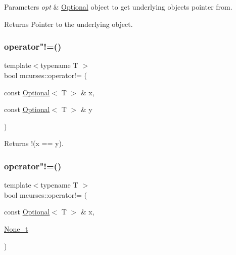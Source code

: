 \begin{DoxyParams}{Parameters}
{\em opt} & \hyperlink{classmcurses_1_1Optional}{Optional} object to get underlying object\textquotesingle{}s pointer from. \\
\hline
\end{DoxyParams}
\begin{DoxyReturn}{Returns}
Pointer to the underlying object. 
\end{DoxyReturn}
\hypertarget{namespacemcurses_a6d95bd0d73b2c0d5127cd67b744f47e3}{}\label{namespacemcurses_a6d95bd0d73b2c0d5127cd67b744f47e3} 
\subsubsection{\texorpdfstring{operator"!=()}{operator!=()}\hspace{0.1cm}{\footnotesize\ttfamily [1/3]}}
{\footnotesize\ttfamily template$<$typename T $>$ \\
bool mcurses\+::operator!= (\begin{DoxyParamCaption}\item[{const \hyperlink{classmcurses_1_1Optional}{Optional}$<$ T $>$ \&}]{x,  }\item[{const \hyperlink{classmcurses_1_1Optional}{Optional}$<$ T $>$ \&}]{y }\end{DoxyParamCaption})}

\begin{DoxyReturn}{Returns}
!(x == y). 
\end{DoxyReturn}
\hypertarget{namespacemcurses_aef267a76cf338ec58e2b79a0691bf52c}{}\label{namespacemcurses_aef267a76cf338ec58e2b79a0691bf52c} 
\subsubsection{\texorpdfstring{operator"!=()}{operator!=()}\hspace{0.1cm}{\footnotesize\ttfamily [2/3]}}
{\footnotesize\ttfamily template$<$typename T $>$ \\
bool mcurses\+::operator!= (\begin{DoxyParamCaption}\item[{const \hyperlink{classmcurses_1_1Optional}{Optional}$<$ T $>$ \&}]{x,  }\item[{\hyperlink{classmcurses_1_1None__t}{None\+\_\+t}}]{ }\end{DoxyParamCaption})\hspace{0.3cm}{\ttfamily [noexcept]}}

